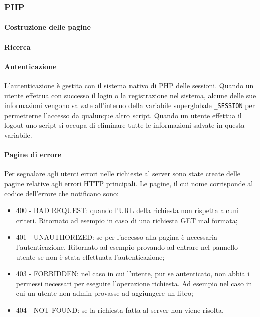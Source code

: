 \documentclass[12pt,a4paper,headings=optiontohead]{article}
\begin{document}
\subsubsection{PHP}
\paragraph{Costruzione delle pagine} %

\paragraph{Ricerca} %

\paragraph{Autenticazione}
L'autenticazione è gestita con il sistema nativo di PHP delle sessioni. Quando un utente effettua con successo il login o la registrazione nel sistema, alcune delle sue informazioni vengono salvate all'interno della variabile superglobale \texttt{\_SESSION} per permetterne l'accesso da qualunque altro script. Quando un utente effettua il logout uno script si occupa di eliminare tutte le informazioni salvate in questa variabile. 

\paragraph{Pagine di errore} %
Per segnalare agli utenti errori nelle richieste al server sono state create delle pagine relative agli errori HTTP principali. Le pagine, il cui nome corrisponde al codice dell'errore che notificano sono:
\begin{itemize}
	\item 400 - BAD REQUEST: quando l'URL della richiesta non rispetta alcuni criteri. Ritornato ad esempio in caso di una richiesta GET mal formata;
	\item 401 - UNAUTHORIZED: se per l'accesso alla pagina è necessaria l'autenticazione. Ritornato ad esempio provando ad entrare nel pannello utente se non è stata effettuata l'autenticazione;
	\item 403 - FORBIDDEN: nel caso in cui l'utente, pur se autenticato, non abbia i permessi necessari per eseguire l'operazione richiesta. Ad esempio nel caso in cui un utente non admin provasse ad aggiungere un libro;
	\item 404 - NOT FOUND: se la richiesta fatta al server non viene risolta.
\end{itemize}
\end{document}
